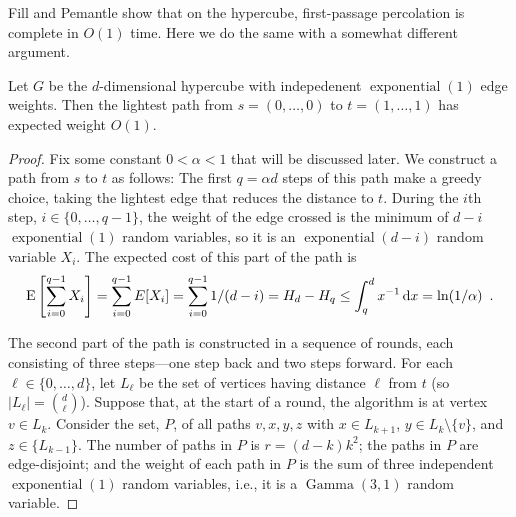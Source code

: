 \documentclass[lotsofwhite]{patmorin}
\DeclareMathOperator{\exponential}{exponential}
\DeclareMathOperator{\gammarv}{Gamma}
\begin{document}
Fill and Pemantle show that on the hypercube, first-passage percolation is complete in $O(1)$ time.  Here we do the same with a somewhat different argument.

\begin{lem}
Let $G$ be the $d$-dimensional hypercube with indepedenent $\exponential(1)$ edge weights.  Then the lightest path from $s=(0,\ldots,0)$ to $t=(1,\ldots,1)$ has expected weight $O(1)$.
\end{lem}

\begin{proof}
Fix some constant $0<\alpha<1$ that will be discussed later.
We construct a path from $s$ to $t$ as follows:  The first
$q=\alpha d$ steps of this path make a greedy choice, taking the
lightest edge that reduces the distance to $t$.  During the $i$th step,
$i\in\{0,\ldots,q-1\}$, the weight of the edge crossed is the minimum of
$d-i$ $\exponential(1)$ random variables, so it is an $\exponential(d-i)$
random variable $X_i$. The expected cost of this part of the path is
\[
   \mathrm{E}\left[\sum_{i=0}^{q-1} X_i\right] = 
   \sum_{i=0}^{q-1} E[X_i] = 
   \sum_{i=0}^{q-1} 1/(d-i) = H_d-H_q \le \int_q^d x^{-1}\,\mathrm{d}x = \ln(1/\alpha)  \enspace .
\]

The second part of the path is constructed in a sequence of rounds,
each consisting of three steps---one step back and two steps forward.
For each $\ell\in\{0,\ldots,d\}$, let $L_\ell$ be the set of vertices
having distance $\ell$ from $t$ (so $|L_\ell|={d\choose \ell}$).  Suppose
that, at the start of a round, the algorithm is at vertex $v\in L_k$.
Consider the set, $P$, of all paths $v,x,y,z$ with $x\in L_{k+1}$, $y\in
L_{k}\setminus\{v\}$, and $z\in\{L_{k-1}\}$. The number of paths in
$P$ is $r=(d-k)k^2$; the paths in $P$ are edge-disjoint; and the weight
of each path in $P$ is the sum of three independent $\exponential(1)$
random variables, i.e., it is a $\gammarv(3,1)$ random variable.


\end{proof}
\end{document}
